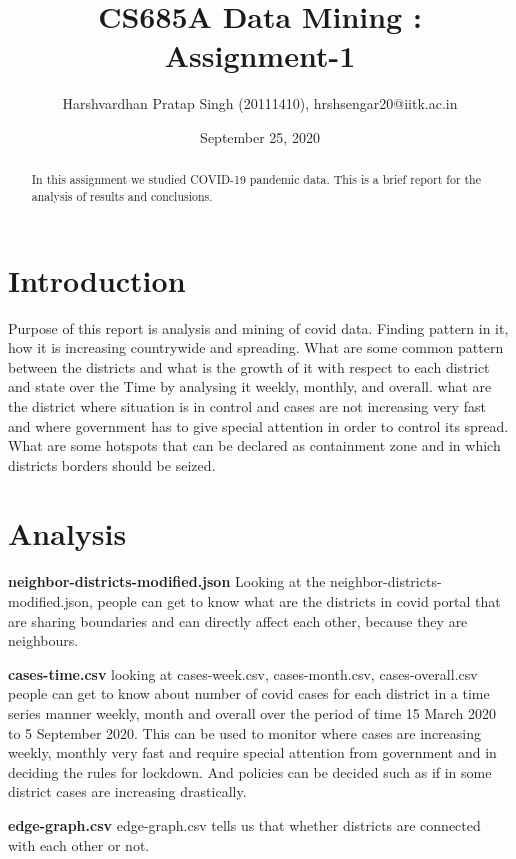 \documentclass[letterpaper,12pt]{article}
\begin{document}
\title{CS685A Data Mining : Assignment-1}
\author{Harshvardhan Pratap Singh (20111410), hrshsengar20@iitk.ac.in}
\date{September 25, 2020}
\maketitle

\begin{abstract}
In this assignment we studied COVID-19 pandemic data. This is a brief report for the analysis of results and conclusions.
\end{abstract}


\section{Introduction}

Purpose of this report is analysis and mining of covid data. Finding pattern in it, how it is increasing countrywide and spreading. What are some common pattern between the districts and what is the growth of it with respect to each district and state over the Time by analysing it weekly, monthly, and overall. what are the district where situation is in control and cases are not increasing very fast and where government has to give special attention in order to control its spread. What are some hotspots that can be declared as containment zone and in which districts borders should be seized.

\section{Analysis}

\textbf{neighbor-districts-modified.json }
Looking at the neighbor-districts-modified.json, people can get to know what are the districts in covid portal that are sharing boundaries and can directly affect each other, because they are neighbours.
 
 
\textbf{cases-time.csv}
looking at cases-week.csv, cases-month.csv, cases-overall.csv people can get to know about number of covid cases for each district in a time series manner weekly, month and overall over the period of time 15 March 2020 to 5 September 2020. This can be used to monitor where cases are increasing weekly, monthly very fast and require special attention from government and in deciding the rules for lockdown. And policies can be decided such as if in some district cases are increasing drastically.

\textbf{edge-graph.csv }
edge-graph.csv tells us that whether districts are connected with each other or not. 
\end{document}
